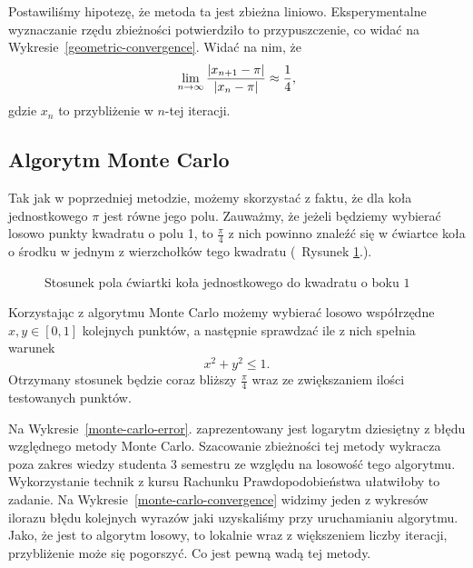 Postawiliśmy hipotezę, że metoda ta jest zbieżna liniowo. Eksperymentalne wyznaczanie rzędu zbieżności potwierdziło to przypuszczenie, co widać na Wykresie~\ref{geometric-convergence}. Widać na nim, że
$$\lim_{n\to\infty}{|x_{n+1}-\pi|\over |x_n-\pi|}\approx\frac14,$$
gdzie $x_n$ to przybliżenie w $n$-tej iteracji.

\subsection{Algorytm Monte Carlo}

Tak jak w poprzedniej metodzie, możemy skorzystać z faktu, że dla koła jednostkowego $\pi$ jest równe jego polu. Zauważmy, że jeżeli będziemy wybierać losowo punkty kwadratu o polu 1, to $\frac\pi4$ z nich powinno znaleźć się w ćwiartce koła o środku w jednym z wierzchołków tego kwadratu (~Rysunek \ref{fig:monte-carlo}.).

\begin{figure}[!h]\centering
{}
\caption{Stosunek pola ćwiartki koła jednostkowego do kwadratu o boku $1$}
\label{fig:monte-carlo}
\end{figure}

Korzystając z algorytmu Monte Carlo możemy wybierać losowo współrzędne $x,y\in[0,1]$ kolejnych punktów, a następnie sprawdzać ile z nich spełnia warunek
$$x^2+y^2\leq1.$$
Otrzymany stosunek będzie coraz bliższy $\frac\pi4$ wraz ze zwiększaniem ilości testowanych punktów.

Na Wykresie~\ref{monte-carlo-error}. zaprezentowany jest logarytm dziesiętny z błędu względnego metody Monte Carlo. Szacowanie zbieżności tej metody wykracza poza zakres wiedzy studenta 3 semestru ze względu na losowość tego algorytmu. Wykorzystanie technik z kursu Rachunku Prawdopodobieństwa ułatwiłoby to zadanie. Na Wykresie~\ref{monte-carlo-convergence} widzimy jeden z wykresów ilorazu błędu kolejnych wyrazów jaki uzyskaliśmy przy uruchamianiu algorytmu. Jako, że jest to algorytm losowy, to lokalnie wraz z większeniem liczby iteracji, przybliżenie może się pogorszyć. Co jest pewną wadą tej metody.

